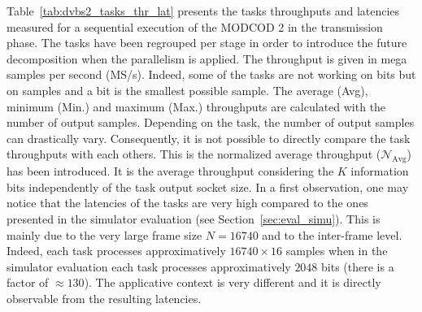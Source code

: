 Table~\ref{tab:dvbs2_tasks_thr_lat} presents the tasks throughputs and latencies
measured for a sequential execution of the MODCOD 2 in the transmission phase.
The tasks have been regrouped per stage in order to introduce the future
decomposition when the parallelism is applied. The throughput is given in mega
samples per second (MS/s). Indeed, some of the tasks are not working on bits but
on samples and a bit is the smallest possible sample. The average (Avg),
minimum (Min.) and maximum (Max.) throughputs are calculated with the number of
output samples. Depending on the task, the number of output samples can
drastically vary. Consequently, it is not possible to directly compare the task
throughputs with each others. This is the normalized average throughput
($\mathcal{N}_\text{Avg}$) has been introduced. It is the average throughput
considering the $K$ information bits independently of the task output socket
size. In a first observation, one may notice that the latencies of the tasks are
very high compared to the ones presented in the simulator evaluation (see
Section~\ref{sec:eval_simu}). This is mainly due to the very large frame size
$N = 16740$ and to the inter-frame level. Indeed, each task processes
approximatively $16740 \times 16$ samples when in the simulator evaluation each
task processes approximatively $2048$ bits (there is a factor of $\approx 130$).
The applicative context is very different and it is directly observable from the
resulting latencies.

